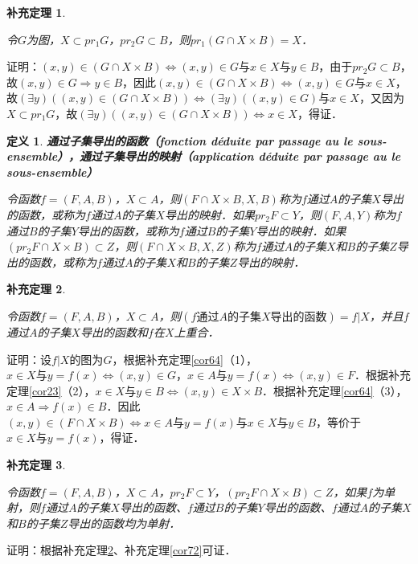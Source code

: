 \documentclass[12pt, a4paper, oneside]{book}
\newtheorem{cor}{补充定理}
\newtheorem{de}{定义}
\begin{document}
			\begin{cor}\label{cor104}
				\hfill\par
				令$G$为图，$X\subset pr_1G$，$pr_2G\subset B$，则$pr_1(G\cap X\times B)=X$．
			\end{cor}
			证明：$(x, y)\in (G\cap X\times B)\Leftrightarrow (x, y)\in G\text{与}x\in X\text{与}y\in B$，由于$pr_2G\subset B$，故$(x, y)\in G\Rightarrow y\in B$，因此$(x, y)\in (G\cap X\times B)\Leftrightarrow (x, y)\in G\text{与}x\in X$，故$(\exists y)((x, y)\in (G\cap X\times B))\Leftrightarrow (\exists y)((x, y)\in G)\text{与}x\in X$，又因为$X\subset pr_1G$，故$(\exists y)((x, y)\in (G\cap X\times B))\Leftrightarrow x\in X$，得证．

			\begin{de}
				\textbf{通过子集导出的函数（fonction déduite par passage au le sous-ensemble），通过子集导出的映射（application déduite par passage au le sous-ensemble）}
				\par
				令函数$f=(F, A, B)$，$X\subset A$，则$(F\cap X\times B, X, B)$称为$f$通过$A$的子集$X$导出的函数，或称为$f$通过$A$的子集$X$导出的映射．如果$pr_2F\subset Y$，则$(F, A, Y)$称为$f$通过$B$的子集$Y$导出的函数，或称为$f$通过$B$的子集$Y$导出的映射．如果$(pr_2F\cap X\times B)\subset Z$，则$(F\cap X\times B, X, Z)$称为$f$通过$A$的子集$X$和$B$的子集$Z$导出的函数，或称为$f$通过$A$的子集$X$和$B$的子集$Z$导出的映射．
			\end{de}
						
			\begin{cor}\label{cor105}
				\hfill\par
				令函数$f=(F, A, B)$，$X\subset A$，则$(f\text{通过}A\text{的子集}X\text{导出的函数})=f|X$，并且$f$通过$A$的子集$X$导出的函数和$f$在$X$上重合．
			\end{cor}
			证明：设$f|X$的图为$G$，根据补充定理\ref{cor64}（1），$x\in X\text{与}y=f(x)\Leftrightarrow (x, y)\in G$，$x\in A\text{与}y=f(x)\Leftrightarrow (x, y)\in F$．根据补充定理\ref{cor23}（2），$x\in X\text{与}y\in B\Leftrightarrow (x, y)\in X\times B$．根据补充定理\ref{cor64}（3），$x\in A\Rightarrow f(x)\in B$．因此$(x, y)\in (F\cap X\times B)\Leftrightarrow x\in A\text{与}y=f(x)\text{与}x\in X\text{与}y\in B$，等价于$x\in X\text{与}y=f(x)$，得证．
			
			\begin{cor}\label{cor106}
				\hfill\par
				令函数$f=(F, A, B)$，$X\subset A$，$pr_2F\subset Y$，$(pr_2F\cap X\times B)\subset Z$，如果$f$为单射，则$f$通过$A$的子集$X$导出的函数、$f$通过$B$的子集$Y$导出的函数、$f$通过$A$的子集$X$和$B$的子集$Z$导出的函数均为单射．
			\end{cor}
			证明：根据补充定理\ref{cor105}、补充定理\ref{cor72}可证．
\end{document}
